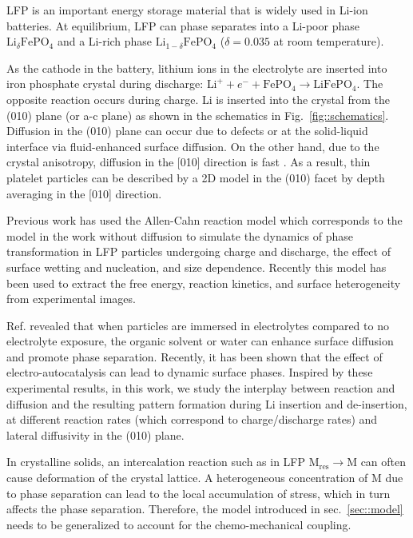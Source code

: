\documentclass[reprint,aps,pre,superscriptaddress]{revtex4-2}
\begin{document}
LFP is an important energy storage material that is widely used in Li-ion batteries\cite{Padhi1997,Kang2009}.
At equilibrium, LFP can phase separates into a Li-poor phase $\text{Li}_\delta \text{FePO}_4$ and a Li-rich phase $\text{Li}_{1-\delta}\text{FePO}_4$ ($\delta=0.035$ at room temperature)\cite{Bai2011,Cogswell2012,Delmas2008,Yamada2006}.

As the cathode in the battery, lithium ions in the electrolyte are inserted into iron phosphate crystal during discharge: $\text{Li}^+ + e^- + \text{FePO}_4 \to \text{LiFePO}_4$. The opposite reaction occurs during charge.
Li is inserted into the crystal from the (010) plane (or a-c plane) as shown in the schematics in Fig.~\ref{fig::schematics}. Diffusion in the (010) plane can occur due to defects\cite{malik2010} or at the solid-liquid interface via fluid-enhanced surface diffusion\cite{Li2018a}. On the other hand, due to the crystal anisotropy, diffusion in the [010] direction is fast \cite{malik2010}. As a result, thin platelet particles can be described by a 2D model in the (010) facet by depth averaging in the [010] direction\cite{Nadkarni2018}.

Previous work has used the Allen-Cahn reaction model which corresponds to the model in the work without diffusion to simulate the dynamics of phase transformation in LFP particles undergoing charge and discharge\cite{Bai2011,Cogswell2012}, the effect of surface wetting and nucleation\cite{Cogswell2013}, and size dependence\cite{Cogswell2018a}. Recently this model has been used to extract the free energy, reaction kinetics, and surface heterogeneity from experimental images\cite{Zhao2023LFP}.

Ref. \cite{Li2018a} revealed that when particles are immersed in electrolytes compared to no electrolyte exposure, the organic solvent or water can enhance surface diffusion and promote phase separation. Recently, it has been shown that the effect of electro-autocatalysis can lead to dynamic surface phases.
Inspired by these experimental results, in this work, we study the interplay between reaction and diffusion and the resulting pattern formation during Li insertion and de-insertion, at different reaction rates (which correspond to charge/discharge rates) and lateral diffusivity in the (010) plane.

In crystalline solids, an intercalation reaction such as in LFP $\text{M}_\text{res} \to \text{M}$ can often cause deformation of the crystal lattice. A heterogeneous concentration of M due to phase separation can lead to the local accumulation of stress, which in turn affects the phase separation. Therefore, the model introduced in sec.~\ref{sec::model} needs to be generalized to account for the chemo-mechanical coupling.
\end{document}
